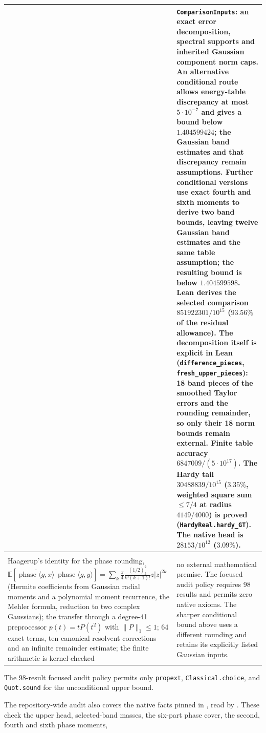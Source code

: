 \documentclass[11pt,a4paper]{article}
\newcommand{\E}{\mathbb{E}}
\newcommand{\ph}{\operatorname{phase}}
\newcommand{\lean}[1]{\texttt{\small #1}}
\begin{document}
\begin{center}
\begin{tabular}{@{}>{\raggedright\arraybackslash}p{}>{\raggedright\arraybackslash}p{}@{}}
&
\lean{ComparisonInputs}: an exact error decomposition, spectral supports and inherited Gaussian component norm caps. An alternative conditional route allows energy-table discrepancy at most $5\cdot10^{-7}$ and gives a bound below $1.404599424$; the Gaussian band estimates and that discrepancy remain assumptions. Further conditional versions use exact fourth and sixth moments to derive two band bounds, leaving twelve Gaussian band estimates and the same table assumption; the resulting bound is below $1.404599598$.
Lean derives the selected comparison $851922301/10^{15}$ ($93.56\%$ of the residual allowance).
The decomposition itself is explicit in Lean (\lean{difference\_pieces}, \lean{fresh\_upper\_pieces}):
18 band pieces of the smoothed Taylor errors and the rounding remainder, so only their 18 norm bounds remain external.
Finite table accuracy $6847009/(5\cdot10^{17})$.
The Hardy tail $30488839/10^{15}$ ($3.35\%$, weighted square sum $\le 7/4$ at radius $4149/4000$) is proved
(\lean{HardyReal.hardy\_GT}).
The native head is $28153/10^{12}$ ($3.09\%$).\\\midrule
\multicolumn{2}{@{}p{0.96\textwidth}@{}}{\raggedright\emph{Unconditional upper bound.}\newline\lean{haagerup\_bound : IsGrothendieckBound (1404909132791/1000000000000)}}\\[2pt]
Haagerup's identity for the phase rounding, $\E[\overline{\ph\langle g,x\rangle}\,\ph\langle g,y\rangle]=\sum_k\frac\pi4\frac{(1/2)_k^2}{k!(k+1)!}z|z|^{2k}$
(Hermite coefficients from Gaussian radial moments and a polynomial moment recurrence, the Mehler formula, reduction to two complex Gaussians); the transfer through
a degree-41 preprocessor $p(t)=tP(t^2)$ with $\|P\|_1\le1$; $64$ exact terms, ten canonical resolvent corrections and an infinite remainder estimate; the finite arithmetic is kernel-checked
&
no external mathematical premise. The focused audit policy requires 98 results and permits zero native axioms. The sharper conditional bound above uses a different rounding and retains its explicitly listed Gaussian inputs.\\\bottomrule
\end{tabular}
\end{center}
The 98-result focused audit policy permits only \lean{propext}, \lean{Classical.choice}, and \lean{Quot.sound} for the unconditional upper bound.\par
The repository-wide audit also covers the native facts pinned in , read by . These check the upper head, selected-band masses, the six-part phase cover, the second, fourth and sixth phase moments,
\end{document}
